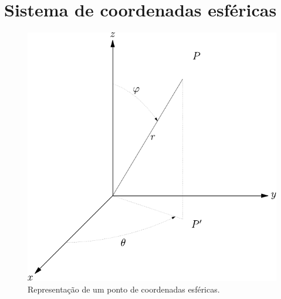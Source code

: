  \section{Sistema de coordenadas esféricas}
\begin{figure}%
      \includegraphics{./cap_algvet/pics/coordenadas_esfericas}
   \caption{Representação de um ponto de coordenadas esféricas.}\label{./cap_algvet/pics/coo_esf}
      \label{fig:coordenadas_esfericas}
       \end{figure}

